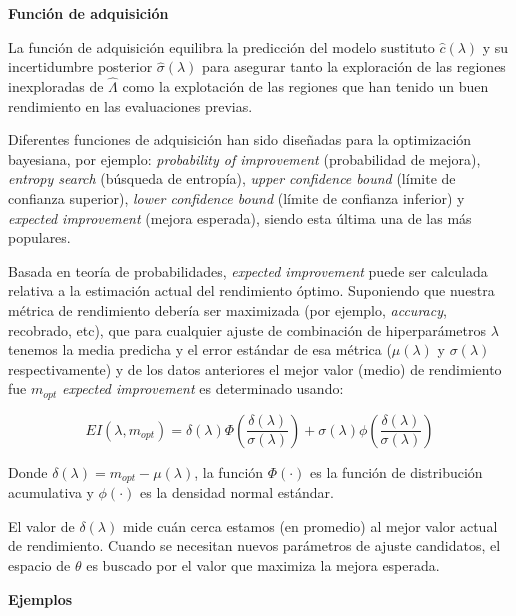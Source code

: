 \quad

\textbf{Función de adquisición}

\quad

La función de adquisición equilibra la predicción del modelo sustituto $\hat{c}(\lambda)$ y su incertidumbre posterior $\hat{\sigma}(\lambda)$ para asegurar tanto la exploración de las regiones inexploradas de $\hat{\varLambda}$ como la explotación de las regiones que han tenido un buen rendimiento en las evaluaciones previas.

Diferentes funciones de adquisición han sido diseñadas para la optimización bayesiana, por ejemplo: \textit{probability of improvement} (probabilidad de mejora), \textit{entropy search} (búsqueda de entropía), \textit{upper confidence bound} (límite de confianza superior), \textit{lower confidence bound} (límite de confianza inferior) y \textit{expected improvement} (mejora esperada), siendo esta última una de las más populares.

Basada en teoría de probabilidades, \textit{expected improvement} puede ser calculada relativa a la estimación actual del rendimiento óptimo. Suponiendo que nuestra métrica de rendimiento debería ser maximizada (por ejemplo, \textit{accuracy}, recobrado, etc), que para cualquier ajuste de combinación de hiperparámetros $\lambda$ tenemos la media predicha y el error estándar de esa métrica ($\mu(\lambda)$ y $\sigma(\lambda)$ respectivamente) y de los datos anteriores el mejor valor (medio) de rendimiento fue $m_{opt}$ \textit{expected improvement} es determinado usando:

$$
 EI(\lambda, m_{opt}) = \delta(\lambda)\Phi\left(\frac{\delta(\lambda)}{\sigma(\lambda)}\right) + \sigma(\lambda)\phi\left(\frac{\delta(\lambda)}{\sigma(\lambda)} \right)
$$

Donde $\delta(\lambda) = m_{opt} - \mu(\lambda)$, la función  $\Phi(\cdot)$ es la función de distribución acumulativa y $\phi(\cdot)$ es la densidad normal estándar.

El valor de $\delta(\lambda)$ mide cuán cerca estamos (en promedio) al mejor valor actual de rendimiento. Cuando se necesitan nuevos parámetros de ajuste candidatos, el espacio de $\theta$ es buscado por el valor que maximiza la mejora esperada.

\quad

\textbf{Ejemplos}

\quad

